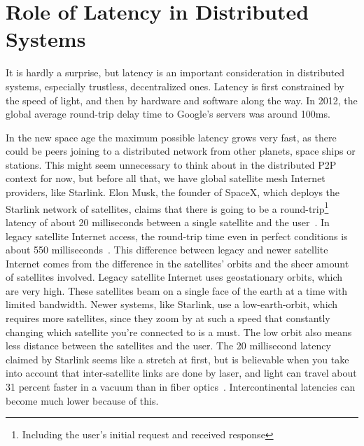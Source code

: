 \section{Role of Latency in Distributed Systems}
It is hardly a surprise, but latency is an important consideration in distributed systems, especially trustless, decentralized ones. Latency is first constrained by the speed of light, and then by hardware and software along the way. In 2012, the global average round-trip delay time to Google's servers was around 100ms.~\cite{Grigorik_undated-mc}

In the new space age the maximum possible latency grows very fast, as there could be peers joining to a distributed network from other planets, space ships or stations. This might seem unnecessary to think about in the distributed P2P context for now, but before all that, we have global satellite mesh Internet providers, like Starlink. Elon Musk, the founder of SpaceX, which deploys the Starlink network of satellites, claims that there is going to be a round-trip\footnote{Including the user's initial request and received response} latency of about 20 milliseconds between a single satellite and the user~\cite{Tung_undated-ny}. In legacy satellite Internet access, the round-trip time even in perfect conditions is about 550 milliseconds~\cite{noauthor_undated-zc}. This difference between legacy and newer satellite Internet comes from the difference in the satellites' orbits and the sheer amount of satellites involved. Legacy satellite Internet uses geostationary orbits, which are very high. These satellites beam on a single face of the earth at a time with limited bandwidth. Newer systems, like Starlink, use a low-earth-orbit, which requires more satellites, since they zoom by at such a speed that constantly changing which satellite you're connected to is a must. The low orbit also means less distance between the satellites and the user. The 20 millisecond latency claimed by Starlink seems like a stretch at first, but is believable when you take into account that inter-satellite links are done by laser, and light can travel about 31 percent faster in a vacuum than in fiber optics~\cite{Finley2013-wt}. Intercontinental latencies can become much lower because of this.

